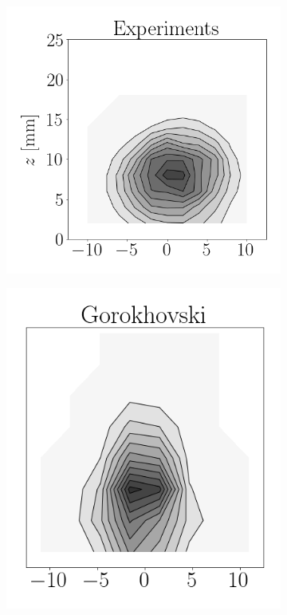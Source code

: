 \clearpage


\begin{figure}[t!]
\flushleft
\begin{subfigure}[b]{0.2\textwidth}
	\flushleft
   \includegraphics[scale=0.4]{./part2_developments/figures_ch6_lagrangian_JICF/params_breakup_model/maps/expe_flux}
\end{subfigure}
\hspace*{0.27in}
\begin{subfigure}[b]{0.2\textwidth}
	\flushleft
   \includegraphics[scale=0.4]{./part2_developments/figures_ch6_lagrangian_JICF/params_breakup_model/maps/goro_flux}

\end{subfigure}
\end{figure}
